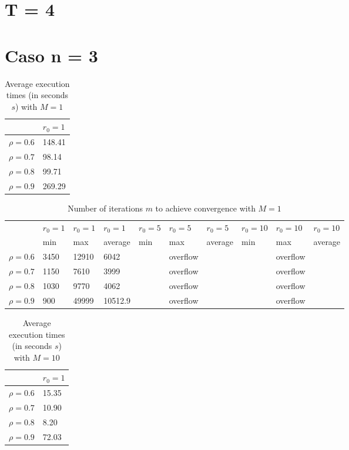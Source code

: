\documentclass[a4paper,11pt,openright]{report}
\begin{document}
\section{T = 4}
\section*{Caso n = 3} 
\begin{table}[H]
\centering
\addtolength{\leftskip}{-1.5cm}
\addtolength{\rightskip}{-1.5cm}
\begin{tabular}{|c|l|}
\hline
$ $ & $r_0 = 1$ \\
\hline
$\rho = 0.6$ & 148.41 \\

$\rho = 0.7$ & 98.14 \\

$\rho = 0.8$ & 99.71 \\

$\rho = 0.9$ & 269.29 \\
\hline
\end{tabular}
\caption{Average execution
 times (in seconds $s$) with $M = 1$}
\end{table}
\begin{table}[H]
\centering
\addtolength{\leftskip}{-1.5cm}
\addtolength{\rightskip}{-1.5cm}
\begin{tabular}{|c|lllllllll|}
\hline
$ $ & $r_0 = 1$ & $r_0 = 1$ & $r_0 = 1$ & $r_0 = 5$ & $r_0 = 5$ & $r_0 = 5$ & $r_0 = 10$ & $r_0 = 10$ & $r_0 = 10$  \\
$ $ & min & max & average & min & max & average & min & max & average \\ 
\hline
$\rho = 0.6$ & 3450 & 12910 & 6042 &  & overflow &  &  & overflow &  \\

$\rho = 0.7$ & 1150 & 7610 & 3999 &  & overflow &  &  & overflow &  \\

$\rho = 0.8$ & 1030 & 9770 & 4062 &  & overflow &  &  & overflow & \\

$\rho = 0.9$ & 900 & 49999 & 10512.9 &  & overflow &  &  & overflow & \\
\hline
\end{tabular}
\caption{Number of iterations $m$ to achieve convergence with $M = 1$}
\end{table}
\begin{table}[H]
\centering
\addtolength{\leftskip}{-1.5cm}
\addtolength{\rightskip}{-1.5cm}
\begin{tabular}{|c|l|}
\hline
$ $ & $r_0 = 1$  \\
\hline
$\rho = 0.6$ & 15.35  \\

$\rho = 0.7$ & 10.90 \\

$\rho = 0.8$ & 8.20 \\

$\rho = 0.9$ & 72.03 \\
\hline
\end{tabular}
\caption{Average execution
 times (in seconds $s$) with $M = 10$}
\end{table}
\end{document}
